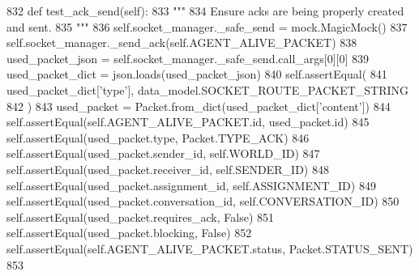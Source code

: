 \begin{DoxyCode}
832     \textcolor{keyword}{def }test\_ack\_send(self):
833         \textcolor{stringliteral}{"""}
834 \textcolor{stringliteral}{        Ensure acks are being properly created and sent.}
835 \textcolor{stringliteral}{        """}
836         self.socket\_manager.\_safe\_send = mock.MagicMock()
837         self.socket\_manager.\_send\_ack(self.AGENT\_ALIVE\_PACKET)
838         used\_packet\_json = self.socket\_manager.\_safe\_send.call\_args[0][0]
839         used\_packet\_dict = json.loads(used\_packet\_json)
840         self.assertEqual(
841             used\_packet\_dict[\textcolor{stringliteral}{'type'}], data\_model.SOCKET\_ROUTE\_PACKET\_STRING
842         )
843         used\_packet = Packet.from\_dict(used\_packet\_dict[\textcolor{stringliteral}{'content'}])
844         self.assertEqual(self.AGENT\_ALIVE\_PACKET.id, used\_packet.id)
845         self.assertEqual(used\_packet.type, Packet.TYPE\_ACK)
846         self.assertEqual(used\_packet.sender\_id, self.WORLD\_ID)
847         self.assertEqual(used\_packet.receiver\_id, self.SENDER\_ID)
848         self.assertEqual(used\_packet.assignment\_id, self.ASSIGNMENT\_ID)
849         self.assertEqual(used\_packet.conversation\_id, self.CONVERSATION\_ID)
850         self.assertEqual(used\_packet.requires\_ack, \textcolor{keyword}{False})
851         self.assertEqual(used\_packet.blocking, \textcolor{keyword}{False})
852         self.assertEqual(self.AGENT\_ALIVE\_PACKET.status, Packet.STATUS\_SENT)
853 
\end{DoxyCode}
\mbox{\label{classparlai_1_1mturk_1_1core_1_1legacy__2018_1_1test_1_1test__socket__manager_1_1TestSocketManagerRoutingFunctionality_a4e114545ebb3f735121b648465955a6c}} 
